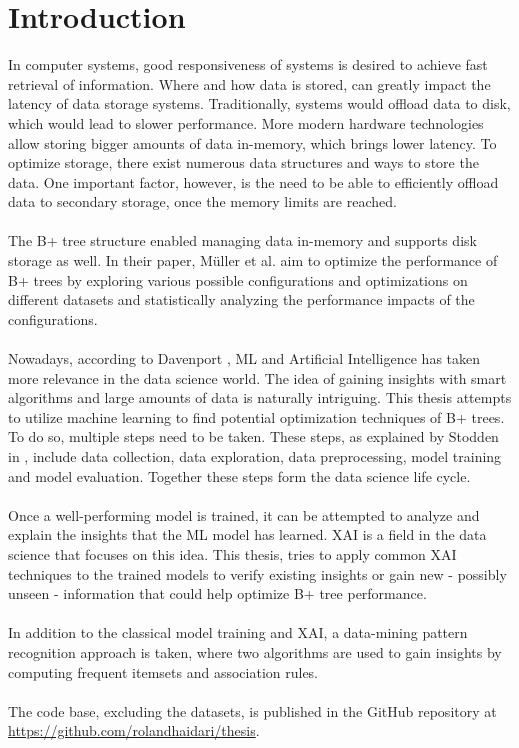 \chapter{Introduction}\label{chapter:introduction}

In computer systems, good responsiveness of systems is desired to achieve fast retrieval of information. Where and how data is stored, can greatly impact the latency of data storage systems. Traditionally, systems would offload data to disk, which would lead to slower performance. More modern hardware technologies allow storing bigger amounts of data in-memory, which brings lower latency. To optimize storage, there exist numerous data structures and ways to store the data. One important factor, however, is the need to be able to efficiently offload data to secondary storage, once the memory limits are reached. 
\\\\
The B+ tree structure enabled managing data in-memory and supports disk storage as well. In their paper, Müller et al. \parencite{mueller2024} aim to optimize the performance of B+ trees by exploring various possible configurations and optimizations on different datasets and statistically analyzing the performance impacts of the configurations. 
\\\\
Nowadays, according to Davenport \parencite{FiveKeyT68:online}, \ac{ML} and Artificial Intelligence has taken more relevance in the data science world. The idea of gaining insights with smart algorithms and large amounts of data is naturally intriguing. This thesis attempts to utilize machine learning to find potential optimization techniques of B+ trees. To do so, multiple steps need to be taken. These steps, as explained by Stodden in \parencite{datasciencelifecycle}, include data collection, data exploration, data preprocessing, model training and model evaluation. Together these steps form the data science life cycle.
\\\\
Once a well-performing model is trained, it can be attempted to analyze and explain the insights that the \ac{ML} model has learned. \ac{XAI} is a field in the data science that focuses on this idea. This thesis, tries to apply common \ac{XAI} techniques to the trained models to verify existing insights or gain new - possibly unseen - information that could help optimize B+ tree performance.
\\\\
In addition to the classical model training and \ac{XAI}, a data-mining pattern recognition approach is taken, where two algorithms are used to gain insights by computing frequent itemsets and association rules.
\\\\
The code base, excluding the datasets, is published in the GitHub repository at \url{https://github.com/rolandhaidari/thesis}.